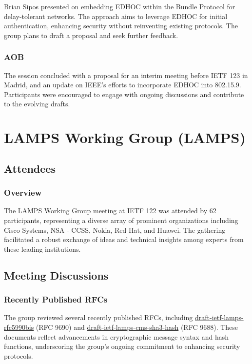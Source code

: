 \documentclass{article}
\begin{document}
Brian Sipos presented on embedding EDHOC within the Bundle Protocol for delay-tolerant networks. The approach aims to leverage EDHOC for initial authentication, enhancing security without reinventing existing protocols. The group plans to draft a proposal and seek further feedback.

\subsubsection{AOB}

The session concluded with a proposal for an interim meeting before IETF 123 in Madrid, and an update on IEEE's efforts to incorporate EDHOC into 802.15.9. Participants were encouraged to engage with ongoing discussions and contribute to the evolving drafts.



\newpage

\section{LAMPS Working Group (LAMPS)}

\subsection{Attendees}
\subsubsection{Overview}
The LAMPS Working Group meeting at IETF 122 was attended by 62 participants, representing a diverse array of prominent organizations including Cisco Systems, NSA - CCSS, Nokia, Red Hat, and Huawei. The gathering facilitated a robust exchange of ideas and technical insights among experts from these leading institutions.

\subsection{Meeting Discussions}

\subsubsection{Recently Published RFCs}
The group reviewed several recently published RFCs, including \href{https://datatracker.ietf.org/doc/html/draft-ietf-lamps-rfc5990bis}{draft-ietf-lamps-rfc5990bis} (RFC 9690) and \href{https://datatracker.ietf.org/doc/html/draft-ietf-lamps-cms-sha3-hash}{draft-ietf-lamps-cms-sha3-hash} (RFC 9688). These documents reflect advancements in cryptographic message syntax and hash functions, underscoring the group's ongoing commitment to enhancing security protocols.
\end{document}
